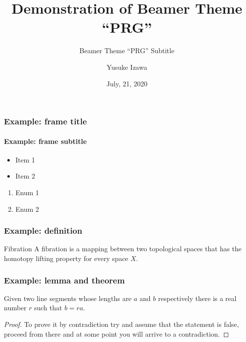 \documentclass{beamer}
\title{Demonstration of Beamer Theme ``PRG''}
\subtitle{Beamer Theme ``PRG'' Subtitle}
\author{Yusuke Izawa}
\date{July, 21, 2020}
\begin{document}
\frame{\maketitle}

\begin{frame}[fragile]
  \frametitle{Example: frame title}
  \framesubtitle{Example: frame subtitle}

  \begin{itemize}
  \item Item 1
  \item Item 2
  \end{itemize}

  \begin{enumerate}
  \item Enum 1
  \item Enum 2
  \end{enumerate}

\end{frame}

\begin{frame}[fragile]
  \frametitle{Example: definition}

  \theoremstyle{definition}
  \begin{definition}{Fibration}
    A fibration is a mapping between two topological spaces that has the homotopy
    lifting property for every space $X$.
  \end{definition}

\end{frame}

\begin{frame}
  \frametitle{Example: lemma and theorem}

  \begin{lemma}
    Given two line segments whose lengths are $a$ and $b$ respectively there
    is a real number $r$ such that $b=ra$.
  \end{lemma}

  \begin{proof}
    To prove it by contradiction try and assume that the statement is false,
    proceed from there and at some point you will arrive to a contradiction.
  \end{proof}
\end{frame}
\end{document}
